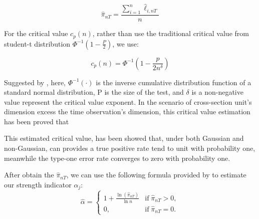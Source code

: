 \documentclass[12pt]{article}
\begin{document}
\[  \hat{\pi}_{nT} = \frac{\sum_{i=1}^n \hat{\ell}_{i,nT}}{n} \tag{4} \label{pi_function} \]


For the critical value $c_p(n)$, rather than use the traditional critical value from student-t distribution $\Phi^{-1}(1-\frac{P}{2})$, we use:

\[   c_p(n) = \Phi^{-1}(1 - \frac{p}{2n^\delta})   \tag{5} \label{critical_value_function} \]

Suggested by , here, $\Phi^{-1}(\cdot)$ is the inverse cumulative distribution function of a standard normal distribution, P is the size of the test, and $\delta$ is a non-negative value represent the critical value exponent. 
In the scenario of cross-section unit's dimension excess the time observation's dimension, this critical value estimation has been proved that 


This estimated critical value, has been showed that, under both Gaussian and non-Gaussian,  can provides a true positive rate tend to unit with probability one, meanwhile the type-one error rate converges to zero with probability one.

After obtain the $\hat{\pi}_{nT}$, we can use the following formula provided by  to estimate our strength indicator $\alpha_j$:
\[ \hat{\alpha} = \begin{cases}
1+\frac{\ln(\hat{\pi}_{nT})}{\ln n} & \text{if}\; \hat{\pi}_{nT} > 0,\\
0, & \text{if}\; \hat{\pi}_{nT} = 0.
\end{cases} \]
\end{document}

